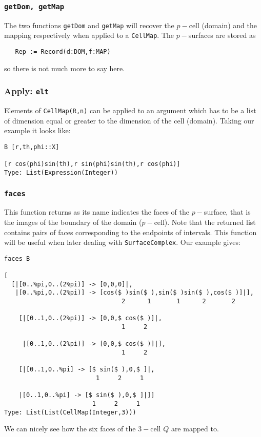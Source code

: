 \documentclass[12pt,a4paper]{article}
\begin{document}
\subsubsection{{\tt getDom, getMap}}
The two functions {\tt getDom} and {\tt getMap} will recover the 
$p-$cell (domain) and the mapping respectively when applied to
a {\tt CellMap}. The $p-$surfaces are stored as
\begin{verbatim}
   Rep := Record(d:DOM,f:MAP)
\end{verbatim}
so there is not much more to say here.
%
\subsubsection{{Apply: \tt elt}}
Elements of {\tt CellMap(R,n)} can be applied to an argument which has
to be a list of dimension equal or greater to the dimension of the 
cell (domain). Taking our example it looks like:
\begin{lstlisting}
B [r,th,phi::X]

[r cos(phi)sin(th),r sin(phi)sin(th),r cos(phi)]
Type: List(Expression(Integer))
\end{lstlisting}
%
\subsubsection{{\tt faces}}
This function returns as its name indicates the faces of the $p-$surface, 
that is the images of the boundary of the domain ($p-$cell). Note that 
the returned list contains pairs of faces corresponding to the endpoints 
of intervals. This function will be useful when later dealing with
{\tt SurfaceComplex}. Our example gives:
\scriptsize
\begin{verbatim}
faces B

[
  [|[0..%pi,0..(2%pi)] -> [0,0,0]|,
   |[0..%pi,0..(2%pi)] -> [cos($ )sin($ ),sin($ )sin($ ),cos($ )]|],
                                2      1       1      2       2

    [|[0..1,0..(2%pi)] -> [0,0,$ cos($ )]|,
                                1     2
                              
     |[0..1,0..(2%pi)] -> [0,0,$ cos($ )]|],
                                1     2
                                
    [|[0..1,0..%pi] -> [$ sin($ ),0,$ ]|,
                         1     2     1                       
    
    |[0..1,0..%pi] -> [$ sin($ ),0,$ ]|]]           
                        1     2     1                     
Type: List(List(CellMap(Integer,3)))
\end{verbatim}
\normalsize 
We can nicely see how the six faces of the $3-$cell $Q$ are mapped to.
\end{document}
